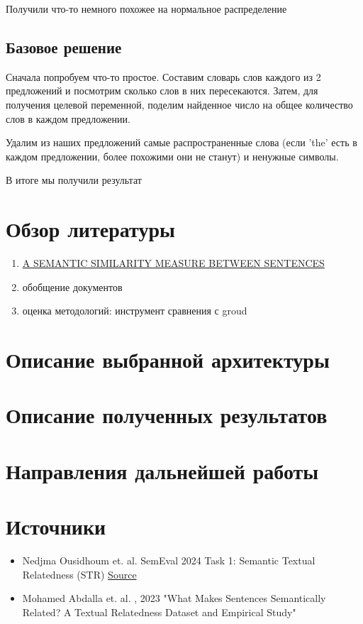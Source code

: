 \documentclass[12pt]{article}
\begin{document}
Получили что-то немного похожее на нормальное распределение

\subsection{Базовое решение}

Сначала попробуем что-то простое. Составим словарь слов каждого из 2 предложений и посмотрим сколько слов в них пересекаются. Затем, для получения целевой переменной, поделим найденное число на общее количество слов в каждом предложении.

Удалим из наших предложений самые распространенные слова (если 'the' есть в каждом предложении, более похожими они не станут) и ненужные символы.

В итоге мы получили результат    




\newpage

\section{Обзор литературы}

 \begin{enumerate}
	\item  \href{https://www.researchgate.net/publication/272088094_A_SEMANTIC_SIMILARITY_MEASURE_BETWEEN_SENTENCES}{A SEMANTIC SIMILARITY MEASURE BETWEEN SENTENCES}
	
	
	\item обобщение документов
	\item оценка методологий: инструмент сравнения с groud
\end{enumerate}



\newpage

\section{Описание выбранной архитектуры}
\newpage


\section{Описание полученных результатов}
\newpage


\section{Направления дальнейшей работы}
\newpage


\section{Источники}
\begin{itemize}
    \item Nedjma Ousidhoum et. al. SemEval 2024 Task 1: Semantic Textual Relatedness (STR)
   \href{https://semantic-textual-relatedness.github.io/}{Source}

   \item Mohamed Abdalla et. al. , 2023 "What Makes Sentences Semantically Related?
   A Textual Relatedness Dataset and Empirical Study"
\end{itemize}
\end{document}
